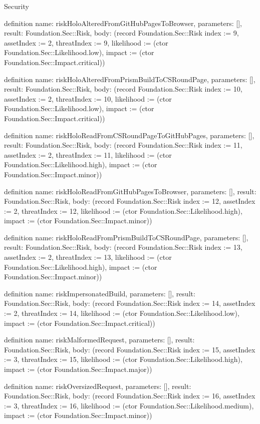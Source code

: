 \begin{lexlean}{Security}
\begin{semanticmodule}
definition{
  name: riskHoloAlteredFromGitHubPagesToBrowser,
  parameters: [],
  result: Foundation.Sec::Risk,
  body: (record Foundation.Sec::Risk {index := 9, assetIndex := 2, threatIndex := 9, likelihood := (ctor Foundation.Sec::Likelihood.low), impact := (ctor Foundation.Sec::Impact.critical)})
}

definition{
  name: riskHoloAlteredFromPrismBuildToCSRoundPage,
  parameters: [],
  result: Foundation.Sec::Risk,
  body: (record Foundation.Sec::Risk {index := 10, assetIndex := 2, threatIndex := 10, likelihood := (ctor Foundation.Sec::Likelihood.low), impact := (ctor Foundation.Sec::Impact.critical)})
}

definition{
  name: riskHoloReadFromCSRoundPageToGitHubPages,
  parameters: [],
  result: Foundation.Sec::Risk,
  body: (record Foundation.Sec::Risk {index := 11, assetIndex := 2, threatIndex := 11, likelihood := (ctor Foundation.Sec::Likelihood.high), impact := (ctor Foundation.Sec::Impact.minor)})
}

definition{
  name: riskHoloReadFromGitHubPagesToBrowser,
  parameters: [],
  result: Foundation.Sec::Risk,
  body: (record Foundation.Sec::Risk {index := 12, assetIndex := 2, threatIndex := 12, likelihood := (ctor Foundation.Sec::Likelihood.high), impact := (ctor Foundation.Sec::Impact.minor)})
}

definition{
  name: riskHoloReadFromPrismBuildToCSRoundPage,
  parameters: [],
  result: Foundation.Sec::Risk,
  body: (record Foundation.Sec::Risk {index := 13, assetIndex := 2, threatIndex := 13, likelihood := (ctor Foundation.Sec::Likelihood.high), impact := (ctor Foundation.Sec::Impact.minor)})
}

definition{
  name: riskImpersonatedBuild,
  parameters: [],
  result: Foundation.Sec::Risk,
  body: (record Foundation.Sec::Risk {index := 14, assetIndex := 2, threatIndex := 14, likelihood := (ctor Foundation.Sec::Likelihood.low), impact := (ctor Foundation.Sec::Impact.critical)})
}

definition{
  name: riskMalformedRequest,
  parameters: [],
  result: Foundation.Sec::Risk,
  body: (record Foundation.Sec::Risk {index := 15, assetIndex := 3, threatIndex := 15, likelihood := (ctor Foundation.Sec::Likelihood.high), impact := (ctor Foundation.Sec::Impact.major)})
}

definition{
  name: riskOversizedRequest,
  parameters: [],
  result: Foundation.Sec::Risk,
  body: (record Foundation.Sec::Risk {index := 16, assetIndex := 3, threatIndex := 16, likelihood := (ctor Foundation.Sec::Likelihood.medium), impact := (ctor Foundation.Sec::Impact.minor)})
}


\end{semanticmodule}
\end{lexlean}
